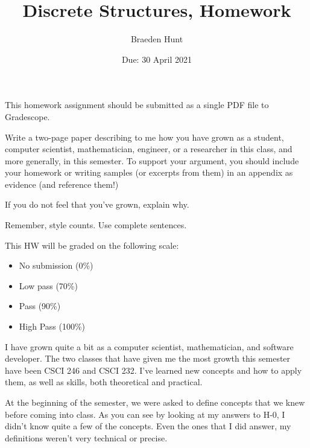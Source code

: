 \documentclass{article}
\title{Discrete Structures, Homework \hwnum}
\author{Braeden Hunt}
\date{Due: 30 April 2021}
\begin{document}
\maketitle

This homework assignment should be
submitted as a single PDF file to Gradescope.

Write a two-page paper describing to me how you have grown as a student,
computer scientist, mathematician, engineer, or a researcher in this class, and
more generally, in this semester.  To support your argument, you should include
your homework or writing samples (or excerpts from them) in an appendix as
evidence (and reference them!)

If you do not feel that you've grown, explain why.

Remember, style counts. Use complete sentences.

This HW will be graded on the following scale:
\begin{itemize}
    \item No submission (0\%)
    \item Low pass (70\%)
    \item Pass (90\%)
    \item High Pass (100\%)
\end{itemize}

\qquad I have grown quite a bit as a computer scientist, mathematician, and software developer. The two 
classes that have given me the most growth this semester have been CSCI 246 and CSCI 232. I've learned new
concepts and how to apply them, as well as skills, both theoretical and practical.

\qquad At the beginning of the semester, we were asked to define concepts that we knew before coming into class.
As you can see by looking at my answers to H-0, I didn't know quite a few of the concepts. Even the ones 
that I did answer, my definitions weren't very technical or precise.
\end{document}
